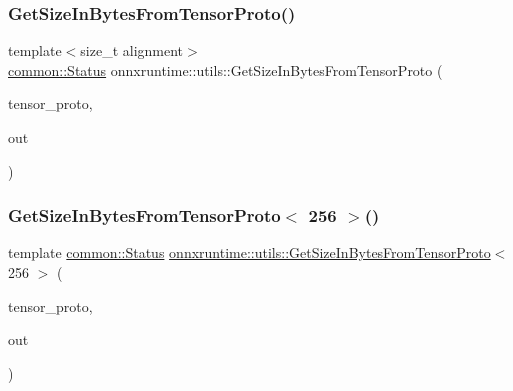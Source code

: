 \subsubsection{\texorpdfstring{Get\+Size\+In\+Bytes\+From\+Tensor\+Proto()}{GetSizeInBytesFromTensorProto()}}
{\footnotesize\ttfamily template$<$size\+\_\+t alignment$>$ \\
\mbox{\hyperlink{classonnxruntime_1_1common_1_1Status}{common\+::\+Status}} onnxruntime\+::utils\+::\+Get\+Size\+In\+Bytes\+From\+Tensor\+Proto (\begin{DoxyParamCaption}\item[{const O\+N\+N\+X\+\_\+\+N\+A\+M\+E\+S\+P\+A\+C\+E\+::\+Tensor\+Proto \&}]{tensor\+\_\+proto,  }\item[{\mbox{\hyperlink{mlasi_8h_a503efbc1c6e50825320ad909366b78ab}{size\+\_\+t}} $\ast$}]{out }\end{DoxyParamCaption})}

\mbox{\label{namespaceonnxruntime_1_1utils_a1fd4746352c986ccbda401da7459ba60}} 
\subsubsection{\texorpdfstring{Get\+Size\+In\+Bytes\+From\+Tensor\+Proto$<$ 256 $>$()}{GetSizeInBytesFromTensorProto< 256 >()}}
{\footnotesize\ttfamily template \mbox{\hyperlink{classonnxruntime_1_1common_1_1Status}{common\+::\+Status}} \mbox{\hyperlink{namespaceonnxruntime_1_1utils_a2d84b5cf8a44b5c9ac8acdc0fd605544}{onnxruntime\+::utils\+::\+Get\+Size\+In\+Bytes\+From\+Tensor\+Proto}}$<$ 256 $>$ (\begin{DoxyParamCaption}\item[{const O\+N\+N\+X\+\_\+\+N\+A\+M\+E\+S\+P\+A\+C\+E\+::\+Tensor\+Proto \&}]{tensor\+\_\+proto,  }\item[{\mbox{\hyperlink{mlasi_8h_a503efbc1c6e50825320ad909366b78ab}{size\+\_\+t}} $\ast$}]{out }\end{DoxyParamCaption})}

\mbox{\label{namespaceonnxruntime_1_1utils_a4b262f6da83860e920ce90279a3fb400}} 
